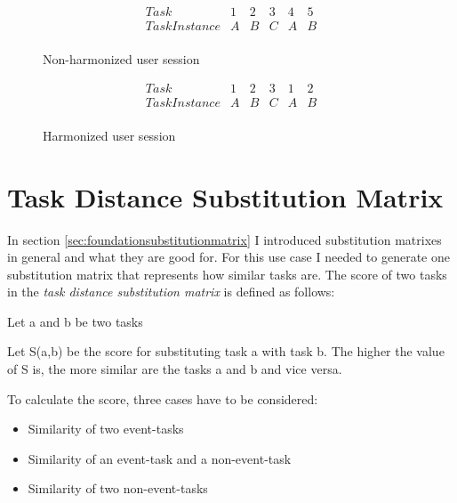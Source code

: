 \begin{figure}[h]
\[
\begin{array}{r|ccccc}
	Task & 1 & 2 & 3 & 4 & 5\\
	\hline
	TaskInstance & A & B & C & A & B\\
\end{array} 
\]
\caption{Non-harmonized user session}
\label{fig:nonharmonized}
\end{figure}

\begin{figure}[h]
\[
\begin{array}{r|ccccc}
	Task & 1 & 2 & 3 & 1 & 2\\
	\hline
	TaskInstance & A & B & C & A & B\\
\end{array} 
\]
\caption{Harmonized user session}
\label{fig:harmonized}
\end{figure}

\section{Task Distance Substitution Matrix}
In section \ref{sec:foundationsubstitutionmatrix} I introduced substitution matrixes in general and what they are good for. 
For this use case I needed to generate one substitution matrix that represents how similar tasks are. 
The score of two tasks in the \textit{task distance substitution matrix} is defined as follows:
\begin{definition}
	\item Let a and b be two tasks
	\item Let S(a,b) be the score for substituting task a with task b. The higher the value of S is, the more similar are the tasks a and b and vice versa.
\end{definition}

To calculate the score, three cases have to be considered:
\begin{itemize}
	\item Similarity of two event-tasks
	\item Similarity of an event-task and a non-event-task
	\item Similarity of two non-event-tasks
\end{itemize}


